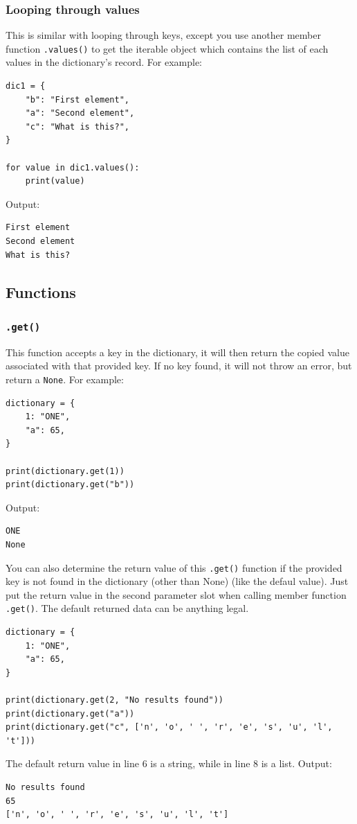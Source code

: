 \documentclass[12pt]{book}
\begin{document}
\subsubsection{Looping through values}
\label{sec:org963cda8}
This is similar with looping through keys, except you use another member function \texttt{.values()} to get the iterable object which contains the list of each values in the dictionary's record. For example:
\begin{verbatim}
dic1 = {
    "b": "First element",
    "a": "Second element",
    "c": "What is this?",
}

for value in dic1.values():
    print(value)
\end{verbatim}
Output:
\begin{verbatim}
First element
Second element
What is this?
\end{verbatim}

\subsection{Functions}
\label{sec:orgda76e22}
\subsubsection{\texttt{.get()}}
\label{sec:orgfb58523}
This function accepts a key in the dictionary, it  will then return the copied value associated with that provided key. If no key found, it will not throw an error, but return a \texttt{None}. For example:
\begin{verbatim}
dictionary = {
    1: "ONE",
    "a": 65,
}

print(dictionary.get(1))
print(dictionary.get("b"))
\end{verbatim}
Output:
\begin{verbatim}
ONE
None
\end{verbatim}

You can also determine the return value of this \texttt{.get()} function if the provided key is not found in the dictionary (other than None) (like the defaul value). Just put the return value in the second parameter slot when calling member function \texttt{.get()}. The default returned data can be anything legal.
\begin{verbatim}
dictionary = {
    1: "ONE",
    "a": 65,
}

print(dictionary.get(2, "No results found"))
print(dictionary.get("a"))
print(dictionary.get("c", ['n', 'o', ' ', 'r', 'e', 's', 'u', 'l', 't']))
\end{verbatim}
The default return value in line 6 is a string, while in line 8 is a list. Output:
\begin{verbatim}
No results found
65
['n', 'o', ' ', 'r', 'e', 's', 'u', 'l', 't']
\end{verbatim}
\end{document}
